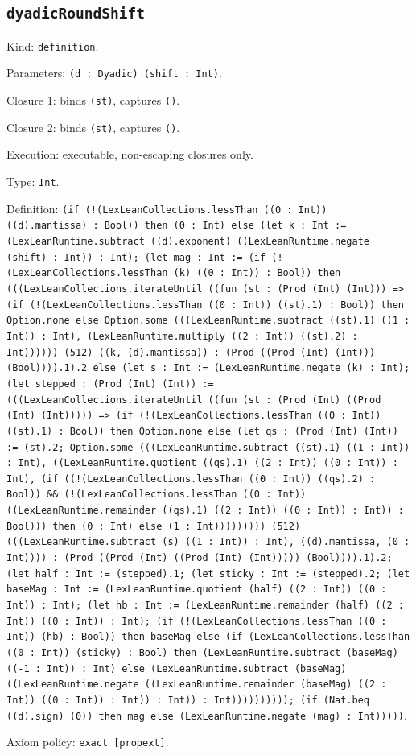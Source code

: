 \documentclass[11pt]{article}
\begin{document}
\subsection*{\texttt{dyadicRoundShift}}
\noindent Kind: \texttt{definition}.\par
\noindent Parameters: \texttt{(d : Dyadic) (shift : Int)}.\par
\noindent Closure 1: binds \texttt{(st)}, captures \texttt{()}.\par
\noindent Closure 2: binds \texttt{(st)}, captures \texttt{()}.\par
\noindent Execution: executable, non-escaping closures only.\par
\noindent Type: \texttt{Int}.\par
\noindent Definition: \texttt{(if (!(LexLeanCollections.lessThan ((0 : Int)) ((d).mantissa) : Bool)) then (0 : Int) else (let k : Int := (LexLeanRuntime.subtract ((d).exponent) ((LexLeanRuntime.negate (shift) : Int)) : Int); (let mag : Int := (if (!(LexLeanCollections.lessThan (k) ((0 : Int)) : Bool)) then (((LexLeanCollections.iterateUntil ((fun (st : (Prod (Int) (Int))) => (if (!(LexLeanCollections.lessThan ((0 : Int)) ((st).1) : Bool)) then Option.none else Option.some (((LexLeanRuntime.subtract ((st).1) ((1 : Int)) : Int), (LexLeanRuntime.multiply ((2 : Int)) ((st).2) : Int)))))) (512) ((k, (d).mantissa)) : (Prod ((Prod (Int) (Int))) (Bool)))).1).2 else (let s : Int := (LexLeanRuntime.negate (k) : Int); (let stepped : (Prod (Int) (Int)) := (((LexLeanCollections.iterateUntil ((fun (st : (Prod (Int) ((Prod (Int) (Int))))) => (if (!(LexLeanCollections.lessThan ((0 : Int)) ((st).1) : Bool)) then Option.none else (let qs : (Prod (Int) (Int)) := (st).2; Option.some (((LexLeanRuntime.subtract ((st).1) ((1 : Int)) : Int), ((LexLeanRuntime.quotient ((qs).1) ((2 : Int)) ((0 : Int)) : Int), (if ((!(LexLeanCollections.lessThan ((0 : Int)) ((qs).2) : Bool)) \&\& (!(LexLeanCollections.lessThan ((0 : Int)) ((LexLeanRuntime.remainder ((qs).1) ((2 : Int)) ((0 : Int)) : Int)) : Bool))) then (0 : Int) else (1 : Int))))))))) (512) (((LexLeanRuntime.subtract (s) ((1 : Int)) : Int), ((d).mantissa, (0 : Int)))) : (Prod ((Prod (Int) ((Prod (Int) (Int))))) (Bool)))).1).2; (let half : Int := (stepped).1; (let sticky : Int := (stepped).2; (let baseMag : Int := (LexLeanRuntime.quotient (half) ((2 : Int)) ((0 : Int)) : Int); (let hb : Int := (LexLeanRuntime.remainder (half) ((2 : Int)) ((0 : Int)) : Int); (if (!(LexLeanCollections.lessThan ((0 : Int)) (hb) : Bool)) then baseMag else (if (LexLeanCollections.lessThan ((0 : Int)) (sticky) : Bool) then (LexLeanRuntime.subtract (baseMag) ((-1 : Int)) : Int) else (LexLeanRuntime.subtract (baseMag) ((LexLeanRuntime.negate ((LexLeanRuntime.remainder (baseMag) ((2 : Int)) ((0 : Int)) : Int)) : Int)) : Int)))))))))); (if (Nat.beq ((d).sign) (0)) then mag else (LexLeanRuntime.negate (mag) : Int)))))}.\par
\noindent Axiom policy: \texttt{exact [propext]}.\par
\end{document}
